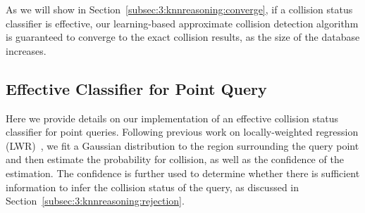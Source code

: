 As we will show in Section~\ref{subsec:3:knnreasoning:converge}, if a collision status classifier is effective, our learning-based approximate collision detection algorithm is guaranteed to converge to the exact collision results, as the size of the database increases.

\subsection{Effective Classifier for Point Query}
\label{subsec:3:knnreasoning:pointclassifier}
Here we provide details on our implementation of an effective collision status classifier for point queries. Following previous work on locally-weighted regression (LWR)~\cite{Cohn96activelearning,Burns:2005:ICRA}, we fit a Gaussian distribution to the region surrounding the  query point and then estimate the probability for collision, as well as the confidence of the estimation. The confidence is further used to determine whether there is sufficient information to infer the collision status of the query, as discussed in Section~\ref{subsec:3:knnreasoning:rejection}.

